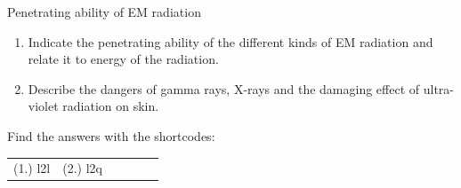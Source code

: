         \label{m38779*uid27}
            \begin{exercises}{Penetrating ability of EM radiation}
            \nopagebreak
        \label{m38779*id189729}\begin{enumerate}[noitemsep, label=\textbf{\arabic*}. ] 
            \label{m38779*uid28}\item Indicate the penetrating ability of the different kinds of EM radiation and relate it to energy of the radiation.\newline
\label{m38779*uid29}\item Describe the dangers of gamma rays, X-rays and the damaging effect of ultra-violet radiation on skin.\newline
\end{enumerate}
    \label{m38779*cid8}
\par {} Find the answers with the shortcodes:
 \par \begin{tabular}[h]{cccccc}
 (1.) l2l  &  (2.) l2q  & \end{tabular}
\end{exercises}


